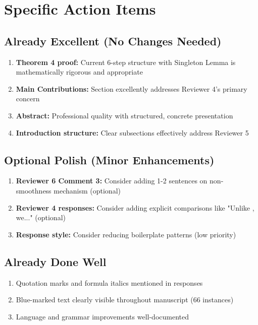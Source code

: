 \documentclass[11pt]{article}
\begin{document}
\section{Specific Action Items}

\subsection{Already Excellent (No Changes Needed)}

\begin{enumerate}
\item \textcolor{success}{\textbf{Theorem 4 proof:}} Current 6-step structure with Singleton Lemma is mathematically rigorous and appropriate
\item \textcolor{success}{\textbf{Main Contributions:}} Section excellently addresses Reviewer 4's primary concern
\item \textcolor{success}{\textbf{Abstract:}} Professional quality with structured, concrete presentation
\item \textcolor{success}{\textbf{Introduction structure:}} Clear subsections effectively address Reviewer 5
\end{enumerate}

\subsection{Optional Polish (Minor Enhancements)}

\begin{enumerate}
\item \textcolor{warning}{\textbf{Reviewer 6 Comment 3:}} Consider adding 1-2 sentences on non-smoothness mechanism (optional)
\item \textcolor{warning}{\textbf{Reviewer 4 responses:}} Consider adding explicit comparisons like "Unlike \cite{X}, we..." (optional)
\item \textbf{Response style:} Consider reducing boilerplate patterns (low priority)
\end{enumerate}

\subsection{Already Done Well}

\begin{enumerate}
\item Quotation marks and formula italics mentioned in responses
\item Blue-marked text clearly visible throughout manuscript (66 instances)
\item Language and grammar improvements well-documented
\end{enumerate}
\end{document}
